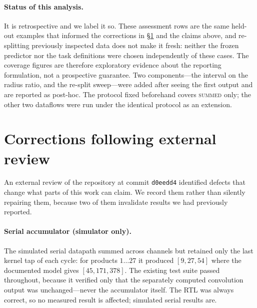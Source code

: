 \documentclass[10pt,conference]{article}
\begin{document}
\paragraph{Status of this analysis.} It is retrospective and we label it so. These
assessment rows are the same held-out examples that informed the corrections in
\S\ref{sec:corrections} and the claims above, and re-splitting previously inspected data
does not make it fresh: neither the frozen predictor nor the task definitions were chosen
independently of these cases. The coverage figures are therefore exploratory evidence
about the reporting formulation, not a prospective guarantee. Two components---the
interval on the radius ratio, and the re-split sweep---were added after seeing the first
output and are reported as post-hoc. The protocol fixed beforehand covers \textsc{summed}
only; the other two dataflows were run under the identical protocol as an extension.

\section{Corrections following external review}
\label{sec:corrections}

An external review of the repository at commit \texttt{d0eedd4} identified defects that
change what parts of this work can claim. We record them rather than silently repairing
them, because two of them invalidate results we had previously reported.

\begin{table}[t]\centering\small
\caption{Phase~0 linear probe, noise-free, before and after correcting the serial
accumulator and splitting on source scene. The original ranking does not survive.}
\label{tab:phase0}

\end{table}

\paragraph{Serial accumulator (simulator only).} The simulated serial datapath summed
across channels but retained only the last kernel tap of each cycle: for products
$1\ldots27$ it produced $[9,27,54]$ where the documented model gives $[45,171,378]$. The
existing test suite passed throughout, because it verified only that the separately
computed convolution output was unchanged---never the accumulator itself. The RTL was
always correct, so no measured result is affected; simulated serial results are.
\end{document}
